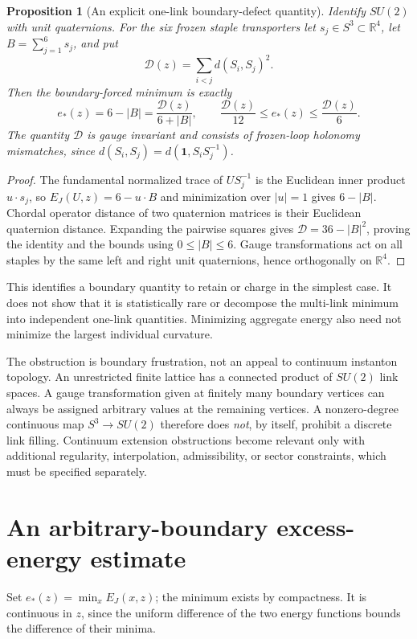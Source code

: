 \documentclass[11pt]{article}
\newtheorem{proposition}[theorem]{Proposition}
\theoremstyle{definition}
\theoremstyle{remark}
\newcommand{\R}{\mathbb R}
\newcommand{\one}{\mathbf1}
\begin{document}
\begin{proposition}[An explicit one-link boundary-defect quantity]
Identify $SU(2)$ with unit quaternions. For the six frozen staple
transporters let $s_j\in S^3\subset\R^4$, let $B=\sum_{j=1}^6s_j$, and
put
\[
 \mathcal D(z)=\sum_{i<j}d(S_i,S_j)^2.
\]
Then the boundary-forced minimum is exactly
\begin{equation}
 e_*(z)=6-|B|=\frac{\mathcal D(z)}{6+|B|},\qquad
 \frac{\mathcal D(z)}{12}\le e_*(z)\le\frac{\mathcal D(z)}6.
 \label{eq:staple-defect}
\end{equation}
The quantity $\mathcal D$ is gauge invariant and consists of frozen-loop
holonomy mismatches, since
$d(S_i,S_j)=d(\one,S_iS_j^{-1})$.
\end{proposition}
\begin{proof}
The fundamental normalized trace of $US_j^{-1}$ is the Euclidean inner
product $u\cdot s_j$, so $E_J(U,z)=6-u\cdot B$ and minimization over
$|u|=1$ gives $6-|B|$. Chordal operator distance of two quaternion
matrices is their Euclidean quaternion distance. Expanding the pairwise
squares gives $\mathcal D=36-|B|^2$, proving the identity and the bounds
using $0\le|B|\le6$. Gauge transformations act on all staples by the same
left and right unit quaternions, hence orthogonally on $\R^4$.
\end{proof}
This identifies a boundary quantity to retain or charge in the simplest
case. It does not show that it is statistically rare or decompose the
multi-link minimum into independent one-link quantities. Minimizing
aggregate energy also need not minimize the largest individual curvature.

The obstruction is boundary frustration, not an appeal to continuum
instanton topology. An unrestricted finite lattice has a connected
product of $SU(2)$ link spaces. A gauge transformation given at finitely
many boundary vertices can always be assigned arbitrary values at the
remaining vertices. A nonzero-degree continuous map $S^3\to SU(2)$
therefore does \emph{not}, by itself, prohibit a discrete link filling.
Continuum extension obstructions become relevant only with additional
regularity, interpolation, admissibility, or sector constraints, which
must be specified separately.

\section{An arbitrary-boundary excess-energy estimate}
Set $e_*(z)=\min_x E_J(x,z)$; the minimum exists by compactness.
It is continuous in $z$, since the uniform difference of the two energy
functions bounds the difference of their minima.
\end{document}
